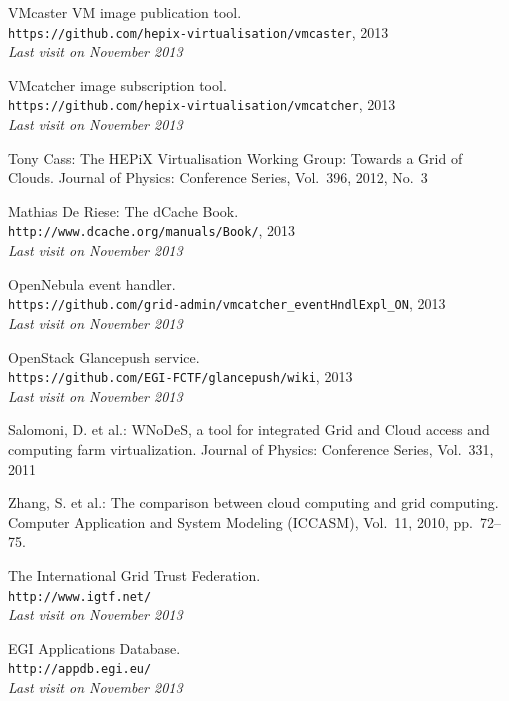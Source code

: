\documentclass{cai}
\begin{document}
\begin{thebibliography}{99}
VMcaster VM image publication tool. \\
\texttt{https://github.com/hepix-virtualisation/vmcaster}, 2013 \\
\textit{Last visit on November 2013}

VMcatcher image subscription tool. \\
\texttt{https://github.com/hepix-virtualisation/vmcatcher}, 2013 \\
\textit{Last visit on November 2013}

Tony Cass: The HEPiX Virtualisation Working Group: Towards a Grid of Clouds.
Journal of Physics: Conference Series,
Vol.~396, 2012, No.~3

Mathias De Riese: The dCache Book. \\
\texttt{http://www.dcache.org/manuals/Book/}, 2013 \\
\textit{Last visit on November 2013}

OpenNebula event handler. \\
\texttt{https://github.com/grid-admin/vmcatcher\_eventHndlExpl\_ON}, 2013 \\
\textit{Last visit on November 2013}

OpenStack Glancepush service. \\
\texttt{https://github.com/EGI-FCTF/glancepush/wiki}, 2013 \\
\textit{Last visit on November 2013}

Salomoni, D. et al.: WNoDeS, a tool for integrated Grid and Cloud access and computing farm virtualization.
Journal of Physics: Conference Series,
Vol.~331, 2011

Zhang, S. et al.: The comparison between cloud computing and grid computing.
Computer Application and System Modeling (ICCASM),
Vol.~11, 2010, pp.~72--75.

The International Grid Trust Federation. \\
\texttt{http://www.igtf.net/}\\
\textit{Last visit on November 2013}

EGI Applications Database. \\
\texttt{http://appdb.egi.eu/} \\
\textit{Last visit on November 2013}

\end{thebibliography}






\label{lastpage}
\end{document}
